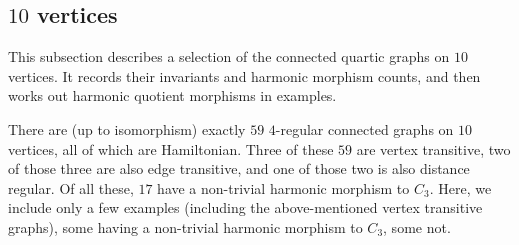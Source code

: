 \documentclass[12pt,letterpaper]{article}
\theoremstyle{definition}
\begin{document}
\subsection{\texorpdfstring{$10$}{10} vertices}

This subsection describes a selection of the connected quartic graphs on $10$ vertices.
It records their invariants and harmonic morphism counts, and then
works out harmonic quotient morphisms in examples.


There are (up to isomorphism) exactly $59$ $4$-regular connected graphs on $10$ vertices, all of which are Hamiltonian.
Three of these $59$ are vertex transitive,
two of those three are also edge transitive, and one of those two is also distance regular.
Of all these, $17$ have a non-trivial harmonic morphism to $C_3$.
Here, we include only a few examples (including the above-mentioned
vertex transitive graphs), some having a non-trivial harmonic
morphism to $C_3$, some not.
\end{document}
